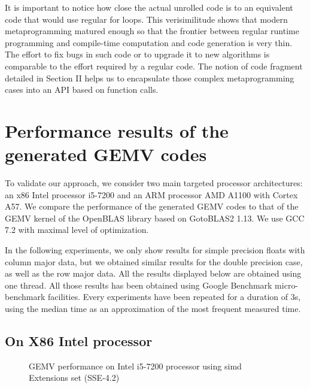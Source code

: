 \documentclass[../main]{subfiles}
\begin{document}
It is important to notice how close the actual unrolled code
is to an equivalent code that would use regular for loops. This
verisimilitude shows that modern metaprogramming matured
enough so that the frontier between regular runtime programming
and compile-time computation and code generation is
very thin. The effort to fix bugs in such code or to upgrade
it to new algorithms is comparable to the effort required
by a regular code. The notion of code fragment detailed
in Section II helps us to encapsulate those complex metaprogramming
cases into an API based on function calls.

\section{
  Performance results of the generated GEMV codes
}

To validate our approach, we consider two main targeted
processor architectures: an x86 Intel processor i5-7200 and an
ARM processor AMD A1100 with Cortex A57. We compare
the performance of the generated GEMV codes to that of the
GEMV kernel of the OpenBLAS library based on GotoBLAS2 1.13\cite{hpcs21}.
We use GCC 7.2\cite{hpcs22} with maximal level of optimization.

In the following experiments, we only show results
for simple precision floats with column major data, but we
obtained similar results for the double precision case, as well
as the row major data. All the results displayed below are
obtained using one thread. All those results has been obtained
using Google Benchmark micro-benchmark facilities. Every
experiments have been repeated for a duration of 3s, using
the median time as an approximation of the most frequent
measured time.

\subsection{
  On X86 Intel processor
}

\begin{figure}[h]
\fontsize{8}{10}\selectfont

\caption{
  GEMV performance on Intel i5-7200 processor using \gls{simd}
  Extensions set (SSE-4.2)
}
\label{fig:gemv-avx-sse}
\end{figure}
\end{document}
